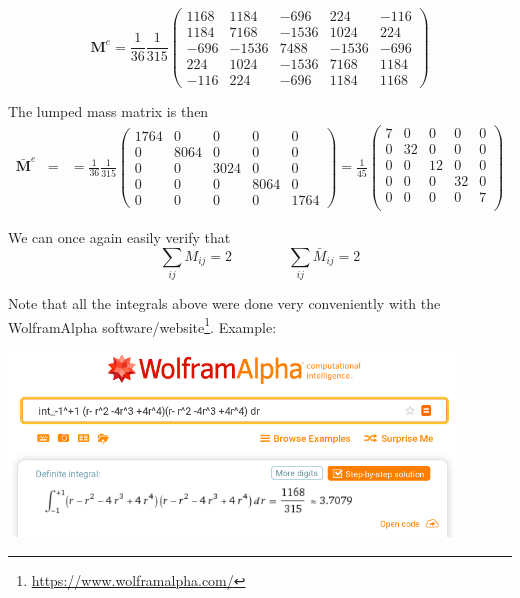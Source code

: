 \begin{equation}
{\bm M}^e
=\frac{1}{36}
\frac{1}{315}
\left(
\begin{array}{ccccc}
1168 & 1184 & -696 & 224 & -116 \\
1184 & 7168   & -1536  &  1024 &  224 \\
-696 & -1536 & 7488  & -1536  & -696  \\
224   & 1024 & -1536 & 7168 & 1184 \\
-116 & 224   & -696 & 1184 & 1168
\end{array}
\right)
\end{equation}

The lumped mass matrix is then
\begin{eqnarray}
\bar{\bm M}^e 
&=&
=\frac{1}{36}
\frac{1}{315}
\left(
\begin{array}{ccccc}
1764 &0&0&0&0\\
0&8064 &0&0&0\\
0&0&3024 &0&0\\
0&0&0&8064 &0\\
0&0&0&0&1764 
\end{array}
\right)
=
\frac{1}{45}
\left(
\begin{array}{ccccc}
7 &0&0&0&0 \\
0&32 &0&0&0 \\
0&0&12  &0&0 \\
0&0&0&32   &0 \\
0&0&0&0&7      \\
\end{array}
\right)
\end{eqnarray}


We can once again easily verify that
\[
\sum_{ij} M_{ij} = 2
\qquad
\qquad
\sum_{ij} \bar{M}_{ij} = 2
\]


Note that all the integrals above were done very conveniently 
with the WolframAlpha software/website\footnote{\url{https://www.wolframalpha.com/}}.
Example:

\begin{center}
\includegraphics[width=12cm]{images/app_massmatrix/wolframalpha}
\end{center}







